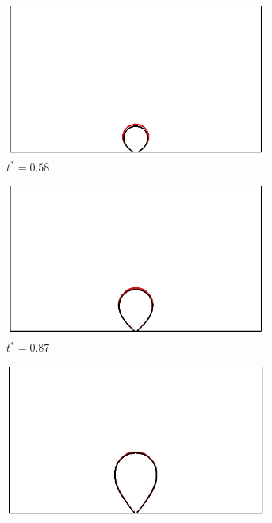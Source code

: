 \begin{figure}[htb]
    \centering
    \begin{subfigure}[t]{0.45\textwidth}
        \centering
        \includegraphics[width=0.95\textwidth]{Imagenes/HetBoiling/gradT/20}   
        \caption{$t^*=0.58$}     
    \end{subfigure}
    \begin{subfigure}[t]{0.45\textwidth}
        \centering
        \includegraphics[width=0.95\textwidth]{Imagenes/HetBoiling/gradT/30}
        \caption{$t^*=0.87$}
    \end{subfigure}
    \begin{subfigure}[t]{0.45\textwidth}
        \centering
        \includegraphics[width=0.95\textwidth]{Imagenes/HetBoiling/gradT/45}

\end{subfigure}
\end{figure}
